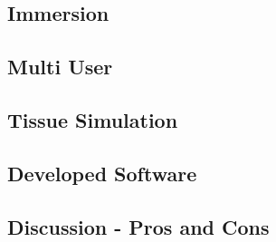 \subsection{\label{sec::Immersion}Immersion}


\subsection{\label{sec::MultiUser}Multi User}


\subsection{\label{sec::TissueSimulation}Tissue Simulation}


\subsection{\label{sec::SurgicalSimulations}Developed Software}


\subsection{\label{sec::RelatedWorkDiscussion}Discussion - Pros and Cons}
